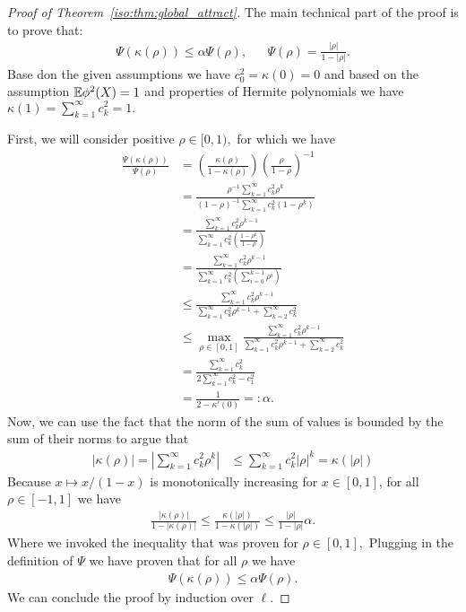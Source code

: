 \begin{proof}[Proof of Theorem~\ref{iso:thm:global_attract}]
 The main technical part of the proof is to prove that:
    \begin{align*}
        \Psi(\kappa(\rho)) \le \alpha \Psi(\rho), && \Psi(\rho) = \frac{|\rho|}{1-|\rho|}.
    \end{align*}
Base don the given assumptions we have $c_0^2 = \kappa(0) = 0$ and based on the assumption $\mathbb{E} \phi^2(X)=1$ and properties of Hermite polynomials we have $\kappa(1)=\sum_{k=1}^\infty c_k^2 = 1.$ 
    
 First, we will consider positive $\rho\in[0,1),$ for which we have
    \begin{align*}
 \frac{\Psi(\kappa(\rho))}{\Psi(\rho)}&=\left(\frac{\kappa(\rho)}{1-\kappa(\rho)}\right)  \left(\frac{\rho}{1-\rho}\right)^{-1}\\  
        &= \frac{\rho^{-1}\sum_{k=1}^\infty c_k^2 \rho^{k} }{(1-\rho)^{-1}\sum_{k=1}^\infty c_k^2 (1-\rho^{k})} \\
        &= \frac{\sum_{k=1}^\infty c_k^2 \rho^{k-1}}{\sum_{k=1}^\infty c_k^2 \left(\frac{1-\rho^{k}}{1-\rho}\right)}\\
        &= \frac{\sum_{k=1}^\infty c_k^2 \rho^{k-1}}{\sum_{k=1}^\infty c_k^2 \left(\sum_{i=0}^{k-1}\rho^{i}\right)}\\
        &\le \frac{\sum_{k=1}^\infty c_k^2\rho^{k-1} }{\sum_{k=1}^\infty c_k^2 \rho^{k-1} + \sum_{k=2}^\infty c_k^2}\\
        &\le \max_{\rho\in[0,1]} \frac{\sum_{k=1}^\infty c_k^2\rho^{k-1} }{\sum_{k=1}^\infty c_k^2 \rho^{k-1} + \sum_{k=2}^\infty c_k^2}\\
        &= \frac{\sum_{k=1}^\infty c_k^2}{2\sum_{k=1}^\infty c_k^2 -c_1^2 } \\
        &=\frac{1}{2-\kappa'(0)} =: \alpha.
    \end{align*}
 Now, we can use the fact that the norm of the sum of values is bounded by the sum of their norms to argue that
    \begin{align*}
 |\kappa(\rho)|=|\sum_{k=1}^\infty c_k^2 \rho^k | &\le \sum_{k=1}^\infty c_k^2 |\rho|^k 
 = \kappa(|\rho|)
    \end{align*}
 Because $x\mapsto x/(1-x)$ is monotonically increasing for $x\in[0,1]$, for all $\rho\in[-1,1]$ we have 
    \begin{align*}
 \frac{|\kappa(\rho)|}{1-|\kappa(\rho)|}\le \frac{\kappa(|\rho|)}{1-\kappa(|\rho|)} \le \frac{|\rho|}{1-|\rho|}\alpha.
    \end{align*}
Where we invoked the inequality that was proven for $\rho\in[0,1], $ Plugging in the definition of $\Psi$ we have proven that for all $\rho$ we have
\begin{align*}
    \Psi(\kappa(\rho)) \le \alpha \Psi(\rho).
\end{align*}
We can conclude the proof by induction over $\ell.$


\end{proof}

